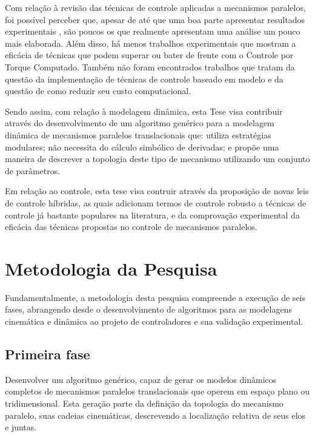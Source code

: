\documentclass[]{politex}
\begin{document}
Com relação à revisão das técnicas de controle aplicadas a mecanismos paralelos, foi possível perceber que, apesar de até que uma boa parte apresentar resultados experimentais \cite{Honegger, Cheng, Shang, Yen, Codourey, Vivas, Duchaine, Chemori, Begon}, são poucos os que realmente apresentam uma análise um pouco mais elaborada. Além disso, há menos trabalhos experimentais que mostram a eficácia de técnicas que podem superar ou bater de frente com o Controle por Torque Computado. Também não foram encontrados trabalhos que tratam da questão da implementação de técnicas de controle baseado em modelo e da questão de como reduzir seu custo computacional.

Sendo assim, com relação à modelagem dinâmica, esta Tese visa contribuir através do desenvolvimento de um algoritmo genérico para a modelagem dinâmica de mecanismos paralelos translacionais que: utiliza estratégias modulares; não necessita do cálculo simbólico de derivadas; e propõe uma maneira de descrever a topologia deste tipo de mecanismo utilizando um conjunto de parâmetros.

Em relação ao controle, esta tese visa contruir através da proposição de novas leis de controle híbridas, as quais adicionam termos de controle robusto a técnicas de controle já bastante populares na literatura, e da comprovação experimental da eficácia das técnicas propostas no controle de mecanismos paralelos.

\chapter{Metodologia da Pesquisa}\label{method}

Fundamentalmente, a metodologia desta pesquisa compreende a execução de seis fases, abrangendo desde o desenvolvimento de algoritmos para as modelagens cinemática e dinâmica ao projeto de controladores e sua validação experimental.

\section{Primeira fase} 
Desenvolver um algoritmo genérico, capaz de gerar os modelos dinâmicos completos de mecanismos paralelos translacionais que operem em espaço plano ou tridimensional. Esta geração parte da definição da topologia do mecanismo paralelo, suas cadeias cinemáticas, descrevendo a localização relativa de seus elos e juntas. 
\end{document}
